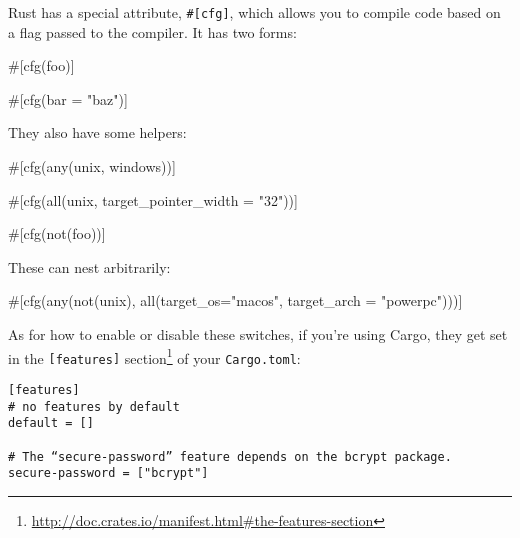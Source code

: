\documentclass[a4paper,]{book}
\newenvironment{Shaded}{\begin{snugshade}}{\end{snugshade}}
\newcommand{\StringTok}[1]{\textcolor[rgb]{0.31,0.60,0.02}{{#1}}}
\newcommand{\AttributeTok}[1]{\textcolor[rgb]{0.77,0.63,0.00}{{#1}}}
\newcommand{\NormalTok}[1]{{#1}}
\renewcommand{\href}[2]{#2\footnote{\url{#1}}}
\begin{document}
Rust has a special attribute, \texttt{\#{[}cfg{]}}, which allows you to
compile code based on a flag passed to the compiler. It has two forms:

\begin{Shaded}
\begin{Highlighting}[]
\AttributeTok{#[}\NormalTok{cfg}\AttributeTok{(}\NormalTok{foo}\AttributeTok{)]}

\AttributeTok{#[}\NormalTok{cfg}\AttributeTok{(}\NormalTok{bar }\AttributeTok{=} \StringTok{"baz"}\AttributeTok{)]}
\end{Highlighting}
\end{Shaded}

They also have some helpers:

\begin{Shaded}
\begin{Highlighting}[]
\AttributeTok{#[}\NormalTok{cfg}\AttributeTok{(}\NormalTok{any}\AttributeTok{(}\NormalTok{unix}\AttributeTok{,} \NormalTok{windows}\AttributeTok{))]}

\AttributeTok{#[}\NormalTok{cfg}\AttributeTok{(}\NormalTok{all}\AttributeTok{(}\NormalTok{unix}\AttributeTok{,} \NormalTok{target_pointer_width }\AttributeTok{=} \StringTok{"32"}\AttributeTok{))]}

\AttributeTok{#[}\NormalTok{cfg}\AttributeTok{(}\NormalTok{not}\AttributeTok{(}\NormalTok{foo}\AttributeTok{))]}
\end{Highlighting}
\end{Shaded}

These can nest arbitrarily:

\begin{Shaded}
\begin{Highlighting}[]
\AttributeTok{#[}\NormalTok{cfg}\AttributeTok{(}\NormalTok{any}\AttributeTok{(}\NormalTok{not}\AttributeTok{(}\NormalTok{unix}\AttributeTok{),} \NormalTok{all}\AttributeTok{(}\NormalTok{target_os}\AttributeTok{=}\StringTok{"macos"}\AttributeTok{,} \NormalTok{target_arch }\AttributeTok{=} \StringTok{"powerpc"}\AttributeTok{)))]}
\end{Highlighting}
\end{Shaded}

As for how to enable or disable these switches, if you're using Cargo,
they get set in the
\href{http://doc.crates.io/manifest.html\#the-features-section}{\texttt{{[}features{]}}
section} of your \texttt{Cargo.toml}:

\begin{verbatim}
[features]
# no features by default
default = []

# The “secure-password” feature depends on the bcrypt package.
secure-password = ["bcrypt"]
\end{verbatim}
\end{document}
